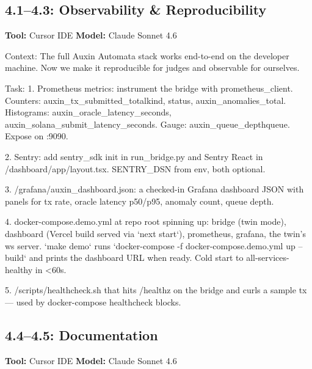 \documentclass[11pt, a4paper]{article}
\begin{document}
\subsection*{4.1--4.3: Observability \& Reproducibility}
\textbf{Tool:} Cursor IDE \quad \textbf{Model:} Claude Sonnet 4.6

\begin{promptbox}
Context: The full Auxin Automata stack works end-to-end on the developer machine. Now we make it reproducible for judges and observable for ourselves.

Task:
1. Prometheus metrics: instrument the bridge with prometheus_client. Counters: auxin_tx_submitted_total{kind, status}, auxin_anomalies_total. Histograms: auxin_oracle_latency_seconds, auxin_solana_submit_latency_seconds. Gauge: auxin_queue_depth{queue}. Expose on :9090.

2. Sentry: add sentry_sdk init in run_bridge.py and Sentry React in /dashboard/app/layout.tsx. SENTRY_DSN from env, both optional.

3. /grafana/auxin_dashboard.json: a checked-in Grafana dashboard JSON with panels for tx rate, oracle latency p50/p95, anomaly count, queue depth.

4. docker-compose.demo.yml at repo root spinning up: bridge (twin mode), dashboard (Vercel build served via `next start`), prometheus, grafana, the twin's ws server. `make demo` runs `docker-compose -f docker-compose.demo.yml up --build` and prints the dashboard URL when ready. Cold start to all-services-healthy in <60s.

5. /scripts/healthcheck.sh that hits /healthz on the bridge and curls a sample tx --- used by docker-compose healthcheck blocks.
\end{promptbox}

\subsection*{4.4--4.5: Documentation}
\textbf{Tool:} Cursor IDE \quad \textbf{Model:} Claude Sonnet 4.6
\end{document}
